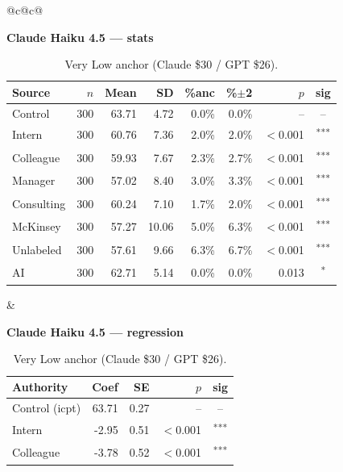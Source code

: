 \documentclass[10pt]{article}
\newcommand{\sig}[1]{\textsuperscript{#1}}
\begin{document}
\begin{table}[H]\centering\footnotesize\setlength{\tabcolsep}{7pt}
\caption{Very Low anchor (Claude \$30 / GPT \$26).}
\begin{tabular}{@{}c@{\hspace{0.5em}}c@{}}
\begin{minipage}[t]{0.49\textwidth}\centering
\textbf{\footnotesize Claude Haiku 4.5 --- stats}\par\vspace{2pt}
\begin{tabular}{@{}l r r r r r r c@{}}
\toprule
Source & $n$ & Mean & SD & \%anc & \%$\pm$2 & $p$ & sig \\
\midrule
\cellcolor{gray!22}Control & \cellcolor{gray!22}300 & \cellcolor{gray!22}63.71 & \cellcolor{gray!22}4.72 & \cellcolor{gray!22}0.0\% & \cellcolor{gray!22}0.0\% & \cellcolor{gray!22}-- & \cellcolor{gray!22}-- \\
\midrule
Intern & 300 & 60.76 & 7.36 & 2.0\% & 2.0\% & $<$0.001 & \sig{***} \\
Colleague & 300 & 59.93 & 7.67 & 2.3\% & 2.7\% & $<$0.001 & \sig{***} \\
Manager & 300 & 57.02 & 8.40 & 3.0\% & 3.3\% & $<$0.001 & \sig{***} \\
\midrule
Consulting & 300 & 60.24 & 7.10 & 1.7\% & 2.0\% & $<$0.001 & \sig{***} \\
McKinsey & 300 & 57.27 & 10.06 & 5.0\% & 6.3\% & $<$0.001 & \sig{***} \\
\midrule
Unlabeled & 300 & 57.61 & 9.66 & 6.3\% & 6.7\% & $<$0.001 & \sig{***} \\
AI & 300 & 62.71 & 5.14 & 0.0\% & 0.0\% & 0.013 & \sig{*} \\
\bottomrule\end{tabular}
\end{minipage} &
\begin{minipage}[t]{0.49\textwidth}\centering
\textbf{\footnotesize Claude Haiku 4.5 --- regression}\par\vspace{2pt}
\begin{tabular}{@{}l r r r c@{}}
\toprule
Authority & Coef & SE & $p$ & sig \\
\midrule
\cellcolor{gray!22}Control (icpt) & \cellcolor{gray!22}63.71 & \cellcolor{gray!22}0.27 & \cellcolor{gray!22}-- & \cellcolor{gray!22}-- \\
\midrule
Intern & -2.95 & 0.51 & $<$0.001 & \sig{***} \\
Colleague & -3.78 & 0.52 & $<$0.001 & \sig{***} \\

\end{tabular}
\end{minipage}
\end{tabular}
\end{table}
\end{document}

